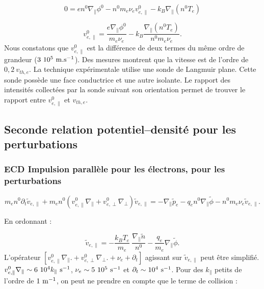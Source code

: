 \documentclass{book}
\begin{document}
\begin{equation}
0=en^0\nabla_\parallel\phi^0-n^0m_e\nu_e v^0_{e,\parallel}-
k_B\nabla_\parallel (n^0T_e)
\end{equation}

\begin{equation}\label{vepz}
v^0_{e,\parallel}=
\frac{e\nabla_\parallel\phi^0}{m_e\nu_e}-k_B\frac{\nabla_\parallel
(n^0T_e)}{n^0m_e\nu_e}. 
\end{equation}
Nous constatons que $v^0_{e,\parallel}$ est la diff\'erence de deux
termes du m\^eme ordre de grandeur ($3\ 10^5\ {\rm m.s}^{-1}$). Des
mesures\cite{Latten95} montrent que la vitesse est de
l'ordre de  $0,2\ v_{th,e}$. La technique exp\'erimentale
\cite{Pierre92} utilise 
une sonde de Langmuir plane. Cette sonde poss\`ede une face
conductrice et une autre isolante. Le rapport des intensit\'es
collect\'ees par la sonde suivant son orientation permet de trouver le
rapport entre $v^0_{e,\parallel}$ et $v_{th,e}$.

\subsection{Seconde relation  potentiel--densit\'e pour les perturbations}


\subsubsection{ECD Impulsion parall\`ele pour les \'electrons,  pour
les perturbations }


\begin{equation}
m_en^0\partial_t\tilde{v}_{e,\parallel}
+m_en^0(v_{e,\parallel}^0\nabla_\parallel+v_{e,\perp}^0\nabla_\perp)\tilde{v}_{e,\parallel}
=-\nabla_\parallel \tilde p_e- q_en^0\nabla_\parallel\tilde\phi
-n^0m_e\nu_e \tilde v_{e,\parallel}.
\end{equation}

En ordonnant :

\begin{equation}
[v_{e,\parallel}^0\nabla_\parallel.
+v_{e,\perp}^0\nabla_\perp
+\nu_e
+\partial_t]
\tilde{v}_{e,\parallel}
=-\frac{k_B T_e}{m_e}\ \frac{\nabla_\parallel \tilde n}{n^0}
-\frac{q_e}{m_e}\nabla_\parallel\tilde\phi.
\end{equation}
L'op\'erateur
$[v_{e,\parallel}^0\nabla_\parallel.+
v_{e,\perp}^0\nabla_\perp.+\nu_e+\partial_t] $ 
agissant sur  $\tilde{v}_{e,\parallel}$ peut \^etre simplifi\'e.
$v_{e,\parallel}^0\nabla_\parallel\sim 6\ 10^{4}k_\parallel \ {\rm s}^{-1}$,
$\nu_e\sim 5\ 10^{5}\ {\rm s}^{-1}$
et $\partial_t\sim 10^{4}\ {\rm s}^{-1}$.
Pour des $k_\parallel$ petits de l'ordre de $1\ {\rm m}^{-1}$, on peut
ne prendre en compte que le terme de collision : 
\end{document}

